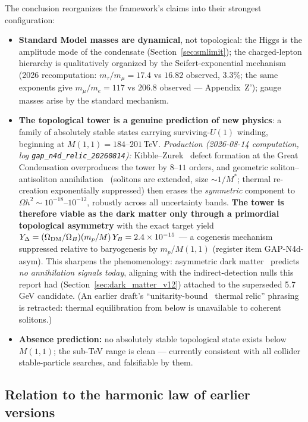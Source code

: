 The conclusion reorganizes the framework's claims into their strongest configuration:
\begin{itemize}
\item \textbf{Standard Model masses are dynamical}, not topological: the Higgs is the
amplitude mode of the condensate (Section~\ref{sec:smlimit}); the charged-lepton hierarchy
is qualitatively organized by the Seifert-exponential mechanism (2026 recomputation:
$m_\tau/m_\mu=17.4$ vs $16.82$ observed, $3.3\%$; the same exponents give $m_\mu/m_e=117$ vs
$206.8$ observed --- Appendix~Z'); gauge masses arise by the standard mechanism.
\item \textbf{The topological tower is a genuine prediction of new physics}: a family of
absolutely stable states carrying surviving-$U(1)$ winding, beginning at
$M(1,1)=184\text{--}201$\,TeV. \emph{Production (2026-08-14 computation, log
\texttt{gap\_n4d\_relic\_20260814}):} Kibble--Zurek~\cite{kibble1976,zurek1985} defect formation at the Great
Condensation overproduces the tower by $8$--$11$ orders, and geometric
soliton--antisoliton annihilation~\cite{preskill1979} (solitons are extended, size $\sim 1/M^*$; thermal
re-creation exponentially suppressed) then erases the \emph{symmetric} component to
$\Omega h^2 \sim 10^{-18}$--$10^{-12}$, robustly across all uncertainty bands.
\textbf{The tower is therefore viable as the dark matter only through a primordial
topological asymmetry} with the exact target yield
$Y_\Delta = (\Omega_{\rm DM}/\Omega_B)(m_p/M)\,Y_B = 2.4\times10^{-15}$ --- a cogenesis
mechanism suppressed relative to baryogenesis by $m_p/M(1,1)$ (register item
GAP-N4d-asym). This sharpens the phenomenology: asymmetric dark matter~\cite{zurek2014} predicts
\emph{no annihilation signals today}, aligning with the indirect-detection nulls this
report had (Section~\ref{sec:dark_matter_v12}) attached to the superseded 5.7\,GeV
candidate. (An earlier draft's ``unitarity-bound~\cite{griest1990} thermal relic'' phrasing is retracted:
thermal equilibration from below is unavailable to coherent solitons.)
\item \textbf{Absence prediction:} no absolutely stable topological state exists below
$M(1,1)$; the sub-TeV range is clean --- currently consistent with all collider
stable-particle searches, and falsifiable by them.
\end{itemize}

\subsection{Relation to the harmonic law of earlier versions}
\label{sec:genesis-old-law}

